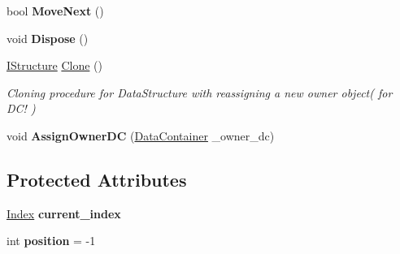 \begin{DoxyCompactItemize}
\item 
\hypertarget{class_dwarf_d_b_1_1_data_structures_1_1_record_ad86f08f6a15fc5bef549031789a01ff8}{bool {\bfseries Move\+Next} ()}\label{class_dwarf_d_b_1_1_data_structures_1_1_record_ad86f08f6a15fc5bef549031789a01ff8}

\item 
\hypertarget{class_dwarf_d_b_1_1_data_structures_1_1_record_a17055913d08d7d28c235547f248d4540}{void {\bfseries Dispose} ()}\label{class_dwarf_d_b_1_1_data_structures_1_1_record_a17055913d08d7d28c235547f248d4540}

\item 
\hyperlink{interface_dwarf_d_b_1_1_data_structures_1_1_i_structure}{I\+Structure} \hyperlink{class_dwarf_d_b_1_1_data_structures_1_1_record_a25e43ac7cdffc69c75cc466c859ce0ad}{Clone} ()
\begin{DoxyCompactList}\small\item\em Cloning procedure for Data\+Structure with reassigning a new owner object( for D\+C! ) \end{DoxyCompactList}\item 
\hypertarget{class_dwarf_d_b_1_1_data_structures_1_1_record_afccd7c4257b4a7953265490700ca5d84}{void {\bfseries Assign\+Owner\+D\+C} (\hyperlink{class_dwarf_d_b_1_1_data_structures_1_1_data_container}{Data\+Container} \+\_\+owner\+\_\+dc)}\label{class_dwarf_d_b_1_1_data_structures_1_1_record_afccd7c4257b4a7953265490700ca5d84}

\end{DoxyCompactItemize}
\subsection*{Protected Attributes}
\begin{DoxyCompactItemize}
\item 
\hypertarget{class_dwarf_d_b_1_1_data_structures_1_1_record_a4db0f67a22a56cb80011e181956ac11e}{\hyperlink{class_dwarf_d_b_1_1_data_structures_1_1_index}{Index} {\bfseries current\+\_\+index}}\label{class_dwarf_d_b_1_1_data_structures_1_1_record_a4db0f67a22a56cb80011e181956ac11e}

\item 
\hypertarget{class_dwarf_d_b_1_1_data_structures_1_1_record_af547c3e838f95ede8120ec33ea410be2}{int {\bfseries position} = -\/1}\label{class_dwarf_d_b_1_1_data_structures_1_1_record_af547c3e838f95ede8120ec33ea410be2}

\end{DoxyCompactItemize}
